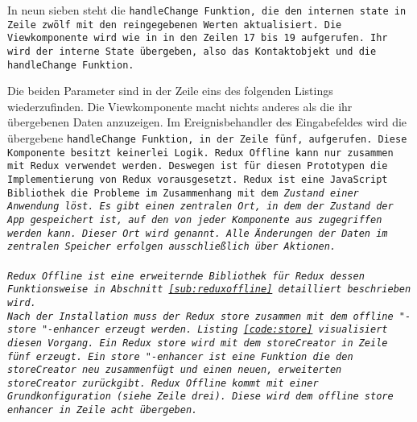 In neun sieben steht die \tt{handleChange} Funktion, die den internen \tt{state} in Zeile zwölf mit den reingegebenen Werten aktualisiert.
Die Viewkomponente wird wie in in den Zeilen 17 bis 19 aufgerufen. Ihr wird der interne State übergeben, also das Kontaktobjekt und die \tt{handleChange} Funktion. 
\begin{center}
  
\end{center}
%
Die beiden Parameter sind in der Zeile eins des folgenden Listings wiederzufinden.
Die Viewkomponente macht nichts anderes als die ihr übergebenen Daten anzuzeigen. Im Ereignisbehandler des Eingabefeldes wird die übergebene \tt{handleChange} Funktion, in der Zeile fünf, aufgerufen.
Diese Komponente besitzt keinerlei Logik.
%
%
Redux Offline kann nur zusammen mit Redux verwendet werden. Deswegen ist für diesen Prototypen die Implementierung von Redux vorausgesetzt.
Redux ist eine JavaScript Bibliothek die Probleme im Zusammenhang mit dem \it{Zustand} einer Anwendung löst.
Es gibt einen zentralen Ort, in dem der \it{Zustand} der App gespeichert ist, auf den von jeder Komponente aus zugegriffen werden kann.
Dieser Ort wird  genannt. Alle Änderungen der Daten im zentralen Speicher erfolgen ausschließlich über Aktionen.\\\\
%
Redux Offline ist eine erweiternde Bibliothek für Redux dessen Funktionsweise in Abschnitt \ref{sub:reduxoffline} detailliert beschrieben wird.\\
Nach der Installation muss der Redux \tt{store} zusammen mit dem \tt{offline "-store "-enhancer} erzeugt werden. Listing \ref{code:store} visualisiert diesen Vorgang. Ein Redux \tt{store} wird mit dem \tt{storeCreator} in Zeile fünf erzeugt. Ein \tt{store "-enhancer} ist eine Funktion die den \tt{storeCreator} neu zusammenfügt und einen neuen, erweiterten \tt{storeCreator} zurückgibt.
Redux Offline kommt mit einer Grundkonfiguration (siehe Zeile drei). Diese wird dem \tt{offline store enhancer} in Zeile acht übergeben.
\begin{center}
  
\end{center}
